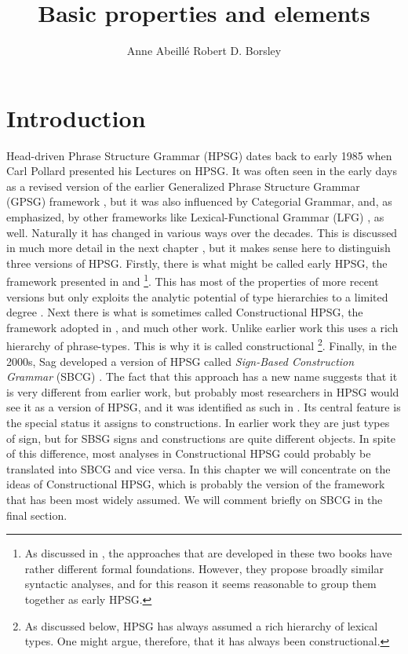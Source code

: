 \documentclass[output=paper
	        ,collection
	        ,collectionchapter
 	        ,biblatex
                ,babelshorthands
                ,newtxmath
                ,draftmode
                ,colorlinks, citecolor=brown
]{langscibook}
\title{Basic properties and elements}
\author{%
 Anne Abeillé\affiliation{Université Paris Diderot}%
 \lastand Robert D. Borsley\affiliation{University of Essex}%
}
\begin{document}
\maketitle
\label{chapter-basic-properties}\label{chap-properties}


\section{Introduction}\label{sec:prop1}
\label{prop:sec-intro}

Head-driven Phrase Structure Grammar (HPSG) dates back to early 1985 when Carl Pollard presented his Lectures on HPSG. It was often seen in the early days as a revised version of the earlier Generalized Phrase Structure Grammar (GPSG) framework \citep{GKPS85a}, but it was also influenced by Categorial Grammar, and, as \citet[1]{ps} emphasized, by other frameworks like Lexical-Functional Grammar (LFG) \citep{Bresnan82a-ed}, as well. Naturally it has changed in various ways over the decades. This is discussed in much more detail in the next chapter , but it makes sense here to distinguish three versions of HPSG. Firstly, there is what might be called early HPSG, the framework presented in \citet{ps} and \citet{ps2}%
%
\footnote{As discussed in , the approaches that are developed in these two books have rather different formal foundations. However, they propose broadly similar syntactic analyses, and for this reason it seems reasonable to group them together as early HPSG.}.
%
This has most of the properties of more recent versions but only exploits the analytic potential of type hierarchies to a limited degree \citep{Flickinger87,FPW85a}. Next there is what is sometimes called Constructional HPSG, the framework adopted in \citet{Sag97a,GSag2000a-u}, and much other work. Unlike earlier work this uses a rich hierarchy of phrase-types. This is why it is called constructional%
%
\footnote{As discussed below, HPSG has always assumed a rich hierarchy of lexical types. One might argue, therefore, that it has always been constructional.}.
%
Finally, in the 2000s, Sag developed a version of HPSG called \emph{Sign-Based Construction Grammar} (SBCG) \citep{Sag2012a}. The fact that this approach has a new name suggests that it is very different from earlier work, but probably most researchers in HPSG would see it as a version of HPSG, and it was identified as such in \citet[486]{Sag2010b}. Its central feature is the special status it assigns to constructions. In earlier work they are just types of sign, but for SBSG signs and constructions are quite different objects. In spite of this difference, most analyses in Constructional HPSG could probably be translated into SBCG and vice versa. In this chapter we will concentrate on the ideas of Constructional HPSG, which is probably the version of the framework that has been most widely assumed. We will comment briefly on SBCG in the final section.
\end{document}
